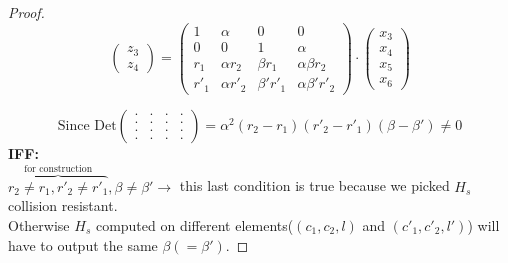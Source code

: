 \begin{proof}
\[\begin{pmatrix}
            z_3\\
            z_4
        \end{pmatrix}
        =
        \begin{pmatrix}
            1 & \alpha & 0 & 0 \\
            0 & 0 & 1 & \alpha \\
            r_1 & \alpha r_2 & \beta r_1 & \alpha\beta r_2 \\
            r'_1 & \alpha r'_2 & \beta' r'_1 & \alpha\beta' r'_2
        \end{pmatrix}
        \cdot
        \begin{pmatrix}
            x_3\\
            x_4\\
            x_5\\
            x_6
        \end{pmatrix}
    \]

    \[ \text{Since Det}
    \begin{pmatrix}
        .&.&.&. \\
        .&.&.&.\\
        .&.&.&.\\
        .&.&.&. 
    \end{pmatrix}=
    \alpha^2(r_2-r_1)(r'_2-r'_1)(\beta-\beta')\neq 0
    \]
    \centering\textbf{IFF:}\\
    $\overbrace{r_2\neq r_1 ,r'_2\neq r'_1}^{\text{for construction}},\beta \neq \beta' \rightarrow$ this last condition is true because we picked $H_s$ collision resistant.\\
    Otherwise $H_s$ computed on different elements($(c_1,c_2,l)$ and $(c'_1,c'_2,l')$) will have to output the same $\beta( = \beta')$.
\end{proof}
